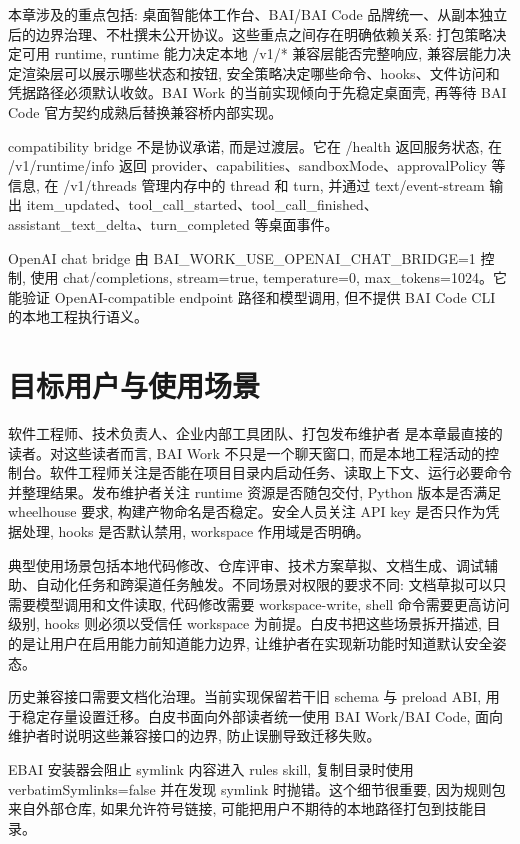 本章涉及的重点包括: 桌面智能体工作台、BAI/BAI Code 品牌统一、从副本独立后的边界治理、不杜撰未公开协议。这些重点之间存在明确依赖关系: 打包策略决定可用 runtime, runtime 能力决定本地 /v1/* 兼容层能否完整响应, 兼容层能力决定渲染层可以展示哪些状态和按钮, 安全策略决定哪些命令、hooks、文件访问和凭据路径必须默认收敛。BAI Work 的当前实现倾向于先稳定桌面壳, 再等待 BAI Code 官方契约成熟后替换兼容桥内部实现。

compatibility bridge 不是协议承诺, 而是过渡层。它在 /health 返回服务状态, 在 /v1/runtime/info 返回 provider、capabilities、sandboxMode、approvalPolicy 等信息, 在 /v1/threads 管理内存中的 thread 和 turn, 并通过 text/event-stream 输出 item\_updated、tool\_call\_started、tool\_call\_finished、assistant\_text\_delta、turn\_completed 等桌面事件。

OpenAI chat bridge 由 BAI\_WORK\_USE\_OPENAI\_CHAT\_BRIDGE=1 控制, 使用 chat/completions, stream=true, temperature=0, max\_tokens=1024。它能验证 OpenAI-compatible endpoint 路径和模型调用, 但不提供 BAI Code CLI 的本地工程执行语义。

\section{目标用户与使用场景}
软件工程师、技术负责人、企业内部工具团队、打包发布维护者 是本章最直接的读者。对这些读者而言, BAI Work 不只是一个聊天窗口, 而是本地工程活动的控制台。软件工程师关注是否能在项目目录内启动任务、读取上下文、运行必要命令并整理结果。发布维护者关注 runtime 资源是否随包交付, Python 版本是否满足 wheelhouse 要求, 构建产物命名是否稳定。安全人员关注 API key 是否只作为凭据处理, hooks 是否默认禁用, workspace 作用域是否明确。

典型使用场景包括本地代码修改、仓库评审、技术方案草拟、文档生成、调试辅助、自动化任务和跨渠道任务触发。不同场景对权限的要求不同: 文档草拟可以只需要模型调用和文件读取, 代码修改需要 workspace-write, shell 命令需要更高访问级别, hooks 则必须以受信任 workspace 为前提。白皮书把这些场景拆开描述, 目的是让用户在启用能力前知道能力边界, 让维护者在实现新功能时知道默认安全姿态。

历史兼容接口需要文档化治理。当前实现保留若干旧 schema 与 preload ABI, 用于稳定存量设置迁移。白皮书面向外部读者统一使用 BAI Work/BAI Code, 面向维护者时说明这些兼容接口的边界, 防止误删导致迁移失败。

EBAI 安装器会阻止 symlink 内容进入 rules skill, 复制目录时使用 verbatimSymlinks=false 并在发现 symlink 时抛错。这个细节很重要, 因为规则包来自外部仓库, 如果允许符号链接, 可能把用户不期待的本地路径打包到技能目录。

